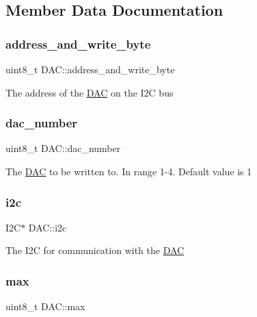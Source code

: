 \subsection{Member Data Documentation}
\hypertarget{class_d_a_c_a1dd1e9c4a63f493da44d7208e59cc83e}{}\label{class_d_a_c_a1dd1e9c4a63f493da44d7208e59cc83e} 
\subsubsection{\texorpdfstring{address\+\_\+and\+\_\+write\+\_\+byte}{address\_and\_write\_byte}}
{\footnotesize\ttfamily uint8\+\_\+t D\+A\+C\+::address\+\_\+and\+\_\+write\+\_\+byte\hspace{0.3cm}{\ttfamily [private]}}

The address of the \hyperlink{class_d_a_c}{D\+AC} on the I2C bus \hypertarget{class_d_a_c_afb39aacc3401c892403c477f857504f8}{}\label{class_d_a_c_afb39aacc3401c892403c477f857504f8} 
\subsubsection{\texorpdfstring{dac\+\_\+number}{dac\_number}}
{\footnotesize\ttfamily uint8\+\_\+t D\+A\+C\+::dac\+\_\+number\hspace{0.3cm}{\ttfamily [private]}}

The \hyperlink{class_d_a_c}{D\+AC} to be written to. In range 1-\/4. Default value is 1 \hypertarget{class_d_a_c_a70a9fd9603ee9fd9303628bd23338bf5}{}\label{class_d_a_c_a70a9fd9603ee9fd9303628bd23338bf5} 
\subsubsection{\texorpdfstring{i2c}{i2c}}
{\footnotesize\ttfamily I2C$\ast$ D\+A\+C\+::i2c\hspace{0.3cm}{\ttfamily [private]}}

The I2C for communication with the \hyperlink{class_d_a_c}{D\+AC} \hypertarget{class_d_a_c_a229a81d8ebf43511dfb6815c5cd8f425}{}\label{class_d_a_c_a229a81d8ebf43511dfb6815c5cd8f425} 
\subsubsection{\texorpdfstring{max}{max}}
{\footnotesize\ttfamily uint8\+\_\+t D\+A\+C\+::max\hspace{0.3cm}{\ttfamily [private]}}

